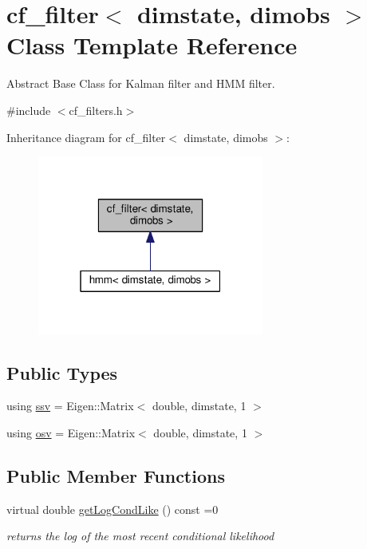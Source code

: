 \hypertarget{classcf__filter}{}\section{cf\+\_\+filter$<$ dimstate, dimobs $>$ Class Template Reference}
\label{classcf__filter}


Abstract Base Class for Kalman filter and H\+MM filter.  




{\ttfamily \#include $<$cf\+\_\+filters.\+h$>$}



Inheritance diagram for cf\+\_\+filter$<$ dimstate, dimobs $>$\+:\nopagebreak
\begin{figure}[H]
\begin{center}
\leavevmode
\includegraphics[width=211pt]{classcf__filter__inherit__graph}
\end{center}
\end{figure}
\subsection*{Public Types}
\begin{DoxyCompactItemize}
\item 
using \hyperlink{classcf__filter_a5562e379d385df4d81c949e32d84ee19}{ssv} = Eigen\+::\+Matrix$<$ double, dimstate, 1 $>$
\item 
using \hyperlink{classcf__filter_acd43942497b773a71465cc5e1ff8fa29}{osv} = Eigen\+::\+Matrix$<$ double, dimstate, 1 $>$
\end{DoxyCompactItemize}
\subsection*{Public Member Functions}
\begin{DoxyCompactItemize}
\item 
virtual double \hyperlink{classcf__filter_a561b2979440ad273807f2ec16bc6f3ae}{get\+Log\+Cond\+Like} () const =0
\begin{DoxyCompactList}\small\item\em returns the log of the most recent conditional likelihood \end{DoxyCompactList}\end{DoxyCompactItemize}


